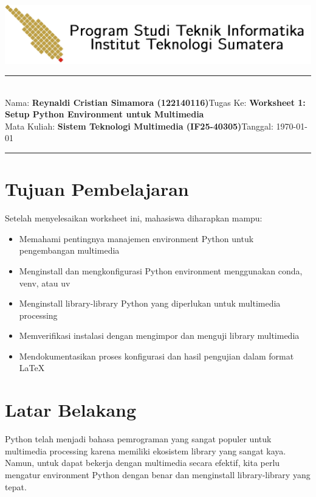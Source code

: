\documentclass[11pt,a4paper]{article}
\newcommand{\student}{\textbf{Reynaldi Cristian Simamora (122140116)}}
\newcommand{\course}{\textbf{Sistem Teknologi Multimedia (IF25-40305)}}
\newcommand{\assignment}{\textbf{Worksheet 1: Setup Python Environment untuk Multimedia}}
\begin{document}
\thispagestyle{empty}
\begin{center}
	\includegraphics[scale = 0.15]{Figure/ifitera-header.png}
	\vspace{0.1cm}
\end{center}
\noindent
\rule{17cm}{0.2cm}\\[0.3cm]
Nama: \student \hfill Tugas Ke: \assignment\\[0.1cm]
Mata Kuliah: \course \hfill Tanggal: \today\\
\rule{17cm}{0.05cm}
\vspace{0.1cm}



\section{Tujuan Pembelajaran}
Setelah menyelesaikan worksheet ini, mahasiswa diharapkan mampu:
\begin{itemize}
    \item Memahami pentingnya manajemen environment Python untuk pengembangan multimedia
    \item Menginstall dan mengkonfigurasi Python environment menggunakan conda, venv, atau uv
    \item Menginstall library-library Python yang diperlukan untuk multimedia processing
    \item Memverifikasi instalasi dengan mengimpor dan menguji library multimedia
    \item Mendokumentasikan proses konfigurasi dan hasil pengujian dalam format \LaTeX
\end{itemize}

\section{Latar Belakang}
Python telah menjadi bahasa pemrograman yang sangat populer untuk multimedia processing karena memiliki ekosistem library yang sangat kaya. Namun, untuk dapat bekerja dengan multimedia secara efektif, kita perlu mengatur environment Python dengan benar dan menginstall library-library yang tepat.
\end{document}
